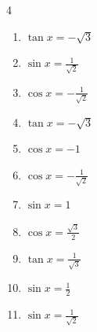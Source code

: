 \begin{multicols}{4}
\begin{enumerate}
  \item $\displaystyle \tan{x}  = -\sqrt{3}$


  \item $\displaystyle \sin{x}  = \frac{1}{\sqrt{2}}$


  \item $\displaystyle \cos{x}  = -\frac{1}{\sqrt{2}}$


  \item $\displaystyle \tan{x}  = -\sqrt{3}$


  \item $\displaystyle \cos{x}  = -1$


\columnbreak %

\resetques

  \item $\displaystyle \cos{x}  = -\frac{1}{\sqrt{2}}$


  \item $\displaystyle \sin{x}  = 1$


  \item $\displaystyle \cos{x}  = \frac{\sqrt{3}}{2}$


  \item $\displaystyle \tan{x}  = \frac{1}{\sqrt{3}}$


  \item $\displaystyle \sin{x}  = \frac{1}{2}$


  \item $\displaystyle \sin{x}  = \frac{1}{\sqrt{2}}$



\end{enumerate}
\end{multicols}

